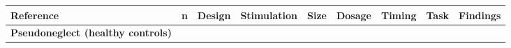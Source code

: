 \documentclass[11pt,]{memoir}
\begin{document}
\begin{longtable}[]{@{}lllllllll@{}}
\begin{minipage}[b]{0.09\columnwidth}
Reference\strut
\end{minipage} & \begin{minipage}[b]{0.02\columnwidth}\raggedright
n\strut
\end{minipage} & \begin{minipage}[b]{0.04\columnwidth}\raggedright
Design\strut
\end{minipage} & \begin{minipage}[b]{0.10\columnwidth}\raggedright
Stimulation\strut
\end{minipage} & \begin{minipage}[b]{0.03\columnwidth}\raggedright
Size\strut
\end{minipage} & \begin{minipage}[b]{0.05\columnwidth}\raggedright
Dosage\strut
\end{minipage} & \begin{minipage}[b]{0.04\columnwidth}\raggedright
Timing\strut
\end{minipage} & \begin{minipage}[b]{0.15\columnwidth}\raggedright
Task\strut
\end{minipage} & \begin{minipage}[b]{0.24\columnwidth}\raggedright
Findings\strut
\end{minipage}\tabularnewline
\midrule
\endhead
\begin{minipage}[t]{0.09\columnwidth}\raggedright
\textbf{Pseudoneglect
(healthy controls)}\strut
\end{minipage} & \begin{minipage}[t]{0.02\columnwidth}\raggedright
\strut
\end{minipage} & \begin{minipage}[t]{0.04\columnwidth}\raggedright
\strut
\end{minipage} & \begin{minipage}[t]{0.10\columnwidth}\raggedright
\strut
\end{minipage} & \begin{minipage}[t]{0.03\columnwidth}\raggedright
\strut
\end{minipage} & \begin{minipage}[t]{0.05\columnwidth}\raggedright
\strut
\end{minipage} & \begin{minipage}[t]{0.04\columnwidth}\raggedright
\strut
\end{minipage} & \begin{minipage}[t]{0.15\columnwidth}\raggedright
\strut
\end{minipage} & \begin{minipage}[t]{0.24\columnwidth}\raggedright

\end{minipage}
\end{longtable}
\end{document}
